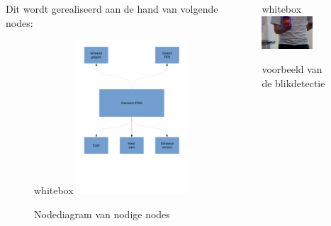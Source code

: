 \documentclass{beamer}
\begin{document}
\begin{frame}[t]
\begin{columns}[t]
\begin{column}{.49\textwidth}
\begin{figure}
	\end{figure}

	\vspace{0.5em}
	
	Dit wordt gerealiseerd aan de hand van volgende nodes:
	\begin{figure}
	 \begin{beamercolorbox}{whitebox}
	  \centering
	  \includegraphics[width=0.7\textwidth]{../../Docs/node_diagram.pdf}
	  \caption{Nodediagram van nodige nodes}
	 \end{beamercolorbox}

	\end{figure}
	
	\end{column}


	\begin{column}{.49\textwidth}
	\begin{figure}
	 \begin{beamercolorbox}{whitebox}
	  \centering
	  \includegraphics[width=0.7\textwidth]{../example_frame.png}
	  \caption{voorbeeld van de blikdetectie}
	 \end{beamercolorbox}


\end{figure}
\end{column}
\end{columns}
\end{frame}
\end{document}
